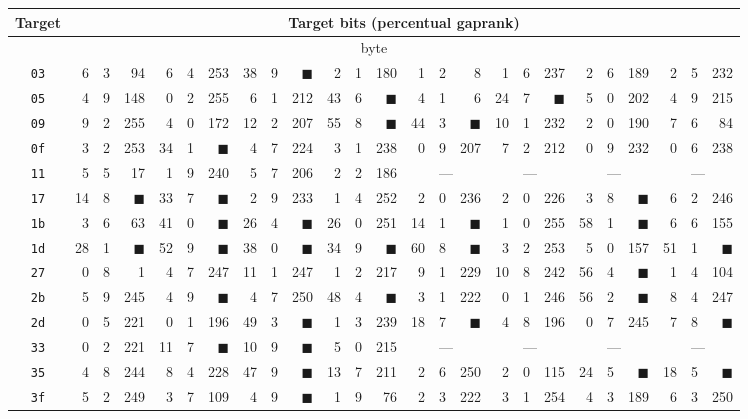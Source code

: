 \begin{tabular}{| c | r@{.} l@{\quad}r | r@{.} l@{\quad}r | r@{.} l@{\quad}r | r@{.} l@{\quad}r | r@{.} l@{\quad}r | r@{.} l@{\quad}r | r@{.} l@{\quad}r | r@{.} l@{\quad}r |}
	\hline
	Target & \multicolumn{24}{c|}{Target bits (percentual gap\quad rank)} \\
	\hline
	\hline
	\multicolumn{25}{|c|}{\nth{0} byte} \\
	\hline
	{\tt 03}&6&3&94&6&4&253&38&9&$\blacksquare$&2&1&180&1&2&8&1&6&237&2&6&189&2&5&232\\
	\hline
	{\tt 05}&4&9&148&0&2&255&6&1&212&43&6&$\blacksquare$&4&1&6&24&7&$\blacksquare$&5&0&202&4&9&215\\
	\hline
	{\tt 09}&9&2&255&4&0&172&12&2&207&55&8&$\blacksquare$&44&3&$\blacksquare$&10&1&232&2&0&190&7&6&84\\
	\hline
	{\tt 0f}&3&2&253&34&1&$\blacksquare$&4&7&224&3&1&238&0&9&207&7&2&212&0&9&232&0&6&238\\
	\hline
	{\tt 11}&5&5&17&1&9&240&5&7&206&2&2&186&\multicolumn{3}{c|}{---}&\multicolumn{3}{c|}{---}&\multicolumn{3}{c|}{---}&\multicolumn{3}{c|}{---}\\
	\hline
	{\tt 17}&14&8&$\blacksquare$&33&7&$\blacksquare$&2&9&233&1&4&252&2&0&236&2&0&226&3&8&$\blacksquare$&6&2&246\\
	\hline
	{\tt 1b}&3&6&63&41&0&$\blacksquare$&26&4&$\blacksquare$&26&0&251&14&1&$\blacksquare$&1&0&255&58&1&$\blacksquare$&6&6&155\\
	\hline
	{\tt 1d}&28&1&$\blacksquare$&52&9&$\blacksquare$&38&0&$\blacksquare$&34&9&$\blacksquare$&60&8&$\blacksquare$&3&2&253&5&0&157&51&1&$\blacksquare$\\
	\hline
	{\tt 27}&0&8&1&4&7&247&11&1&247&1&2&217&9&1&229&10&8&242&56&4&$\blacksquare$&1&4&104\\
	\hline
	{\tt 2b}&5&9&245&4&9&$\blacksquare$&4&7&250&48&4&$\blacksquare$&3&1&222&0&1&246&56&2&$\blacksquare$&8&4&247\\
	\hline
	{\tt 2d}&0&5&221&0&1&196&49&3&$\blacksquare$&1&3&239&18&7&$\blacksquare$&4&8&196&0&7&245&7&8&$\blacksquare$\\
	\hline
	{\tt 33}&0&2&221&11&7&$\blacksquare$&10&9&$\blacksquare$&5&0&215&\multicolumn{3}{c|}{---}&\multicolumn{3}{c|}{---}&\multicolumn{3}{c|}{---}&\multicolumn{3}{c|}{---}\\
	\hline
	{\tt 35}&4&8&244&8&4&228&47&9&$\blacksquare$&13&7&211&2&6&250&2&0&115&24&5&$\blacksquare$&18&5&$\blacksquare$\\
	\hline
	{\tt 3f}&5&2&249&3&7&109&4&9&$\blacksquare$&1&9&76&2&3&222&3&1&254&4&3&189&6&3&250\\

\end{tabular}
